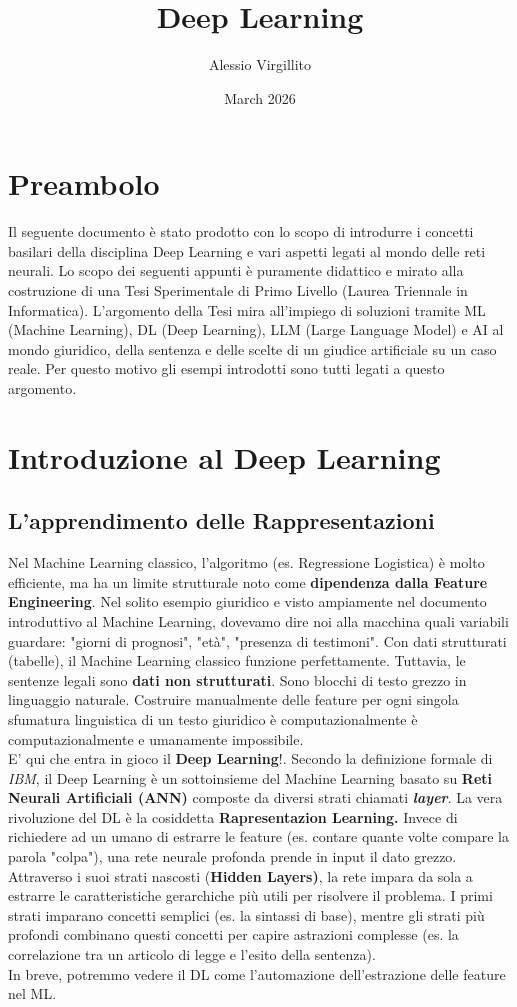 \documentclass{article}
\title{Deep Learning}
\author{Alessio Virgillito}
\date{March 2026}
\begin{document}
\maketitle
\tableofcontents
\newpage

\section{Preambolo}
Il seguente documento è stato prodotto con lo scopo di introdurre i concetti basilari della disciplina Deep Learning e vari aspetti legati al mondo delle reti neurali. Lo scopo dei seguenti appunti è puramente didattico e mirato alla costruzione di una Tesi Sperimentale di Primo Livello (Laurea Triennale in Informatica). L'argomento della Tesi mira all'impiego di soluzioni tramite ML (Machine Learning), DL (Deep Learning), LLM (Large Language Model) e AI al mondo giuridico, della sentenza e delle scelte di un giudice artificiale su un caso reale. Per questo motivo gli esempi introdotti sono tutti legati a questo argomento.
\section{Introduzione al Deep Learning}
\subsection{L'apprendimento delle Rappresentazioni}
Nel Machine Learning classico, l'algoritmo (es. Regressione Logistica) è molto efficiente, ma ha un limite strutturale noto come \textbf{dipendenza dalla Feature Engineering}. Nel solito esempio giuridico e visto ampiamente nel documento introduttivo al Machine Learning, dovevamo dire noi alla macchina quali variabili guardare: "giorni di prognosi", "età", "presenza di testimoni". Con dati strutturati (tabelle), il Machine Learning classico funzione perfettamente. Tuttavia, le sentenze legali sono \textbf{dati non strutturati}. Sono blocchi di testo grezzo in linguaggio naturale. Costruire manualmente delle feature per ogni singola sfumatura linguistica di un testo giuridico è computazionalmente è computazionalmente e umanamente impossibile.
\\
E' qui che entra in gioco il \textbf{Deep Learning}!. Secondo la definizione formale di \textit{IBM}, il Deep Learning è un sottoinsieme del Machine Learning basato su \textbf{Reti Neurali Artificiali (ANN)} composte da diversi strati chiamati \textbf{\textit{layer}}. La vera rivoluzione del DL è la cosiddetta \textbf{Rapresentazion Learning.} Invece di richiedere ad un umano di estrarre le feature (es. contare quante volte compare la parola "colpa"), una rete neurale profonda prende in input il dato grezzo.
\\
Attraverso i suoi strati nascosti (\textbf{Hidden Layers)}, la rete impara da sola a estrarre le caratteristiche gerarchiche più utili per risolvere il problema. I primi strati imparano concetti semplici (es. la sintassi di base), mentre gli strati più profondi combinano questi concetti per capire astrazioni complesse (es. la correlazione tra un articolo di legge e l'esito della sentenza).
\\
In breve, potremmo vedere il DL come l'automazione dell'estrazione delle feature nel ML.
\end{document}
